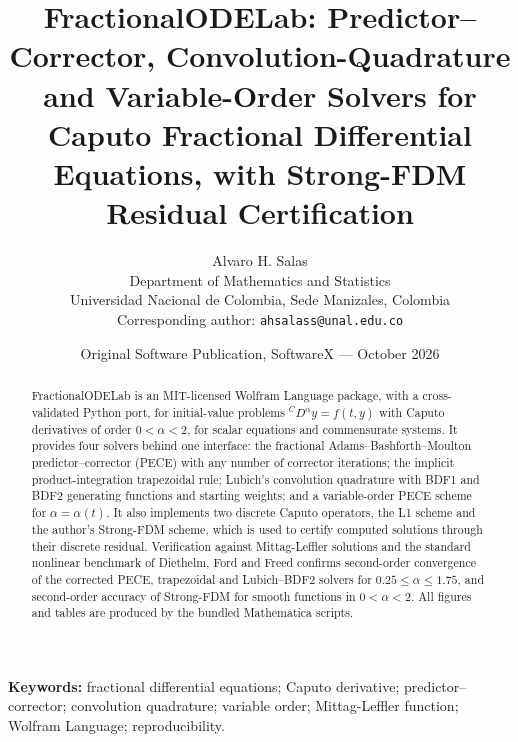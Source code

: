 \documentclass[11pt]{article}
\title{FractionalODELab: Predictor--Corrector, Convolution-Quadrature and Variable-Order Solvers for Caputo Fractional Differential Equations, with Strong-FDM Residual Certification}
\author{Alvaro H. Salas\\[2pt]\normalsize Department of Mathematics and Statistics\\\normalsize Universidad Nacional de Colombia, Sede Manizales, Colombia\\[2pt]\normalsize Corresponding author: \texttt{ahsalass@unal.edu.co}}
\date{Original Software Publication, SoftwareX --- October 2026}
\begin{document}
\sloppy\maketitle
\begin{abstract}
FractionalODELab is an MIT-licensed Wolfram Language package, with a cross-validated Python port, for initial-value problems ${}^{C}\!D^{\alpha}y=f(t,y)$ with Caputo derivatives of order $0<\alpha<2$, for scalar equations and commensurate systems. It provides four solvers behind one interface: the fractional Adams--Bashforth--Moulton predictor--corrector (PECE) with any number of corrector iterations; the implicit product-integration trapezoidal rule; Lubich's convolution quadrature with BDF1 and BDF2 generating functions and starting weights; and a variable-order PECE scheme for $\alpha=\alpha(t)$. It also implements two discrete Caputo operators, the L1 scheme and the author's Strong-FDM scheme, which is used to certify computed solutions through their discrete residual. Verification against Mittag-Leffler solutions and the standard nonlinear benchmark of Diethelm, Ford and Freed confirms second-order convergence of the corrected PECE, trapezoidal and Lubich--BDF2 solvers for $0.25\le\alpha\le1.75$, and second-order accuracy of Strong-FDM for smooth functions in $0<\alpha<2$. All figures and tables are produced by the bundled Mathematica scripts.
\end{abstract}
\noindent\textbf{Keywords:} fractional differential equations; Caputo derivative; predictor--corrector; convolution quadrature; variable order; Mittag-Leffler function; Wolfram Language; reproducibility.
\end{document}
